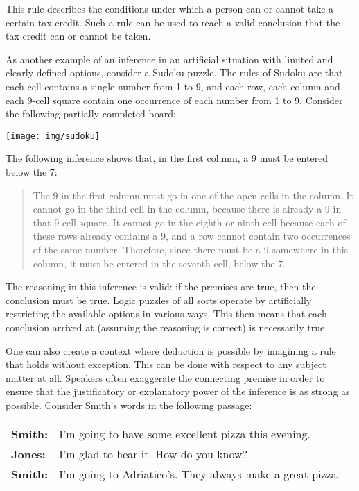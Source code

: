 This rule describes the conditions under which a person can or cannot take a certain tax credit. Such a rule can be used to reach a valid conclusion that the tax credit can or cannot be taken.

As another example of an inference in an artificial situation with limited and clearly defined options, consider a Sudoku puzzle. The rules of Sudoku are that each cell contains a single number from 1 to 9, and each row, each column and each 9-cell square contain one occurrence of each number from 1 to 9. Consider the following partially completed board:

\begin{center}
\noindent \texttt{[image: img/sudoku]}
\end{center}

The following inference shows that, in the first column, a 9 must be entered below the 7:

\begin{quote} The 9 in the first column must go in one of the open cells in the column. It cannot go in the third cell in the column, because there is already a 9 in that 9-cell square. It cannot go in the eighth or ninth cell because each of these rows already contains a 9, and a row cannot contain two occurrences of the same number. Therefore, since there must be a 9 somewhere in this column, it must be entered in the seventh cell, below the 7.\end{quote}

The reasoning in this inference is valid: if the premises are true, then the conclusion must be true. Logic puzzles of all sorts operate by artificially restricting the available options in various ways. This then means that each conclusion arrived at (assuming the reasoning is correct) is necessarily true.

One can also create a context where deduction is possible by imagining a rule that holds without exception. This can be done with respect to any subject matter at all. Speakers often exaggerate the connecting premise in order to ensure that the justificatory or explanatory power of the inference is as strong as possible. Consider Smith's words in the following passage:


\begin{longtabu} to \textwidth {X[1.2,p] X[8,p]}
\textbf{Smith:} & I'm going to have some excellent pizza this evening. \\
\textbf{Jones:} & I'm glad to hear it. How do you know?\\
\textbf{Smith:} & I'm going to Adriatico's. They always make a great pizza. \\
\end{longtabu}

